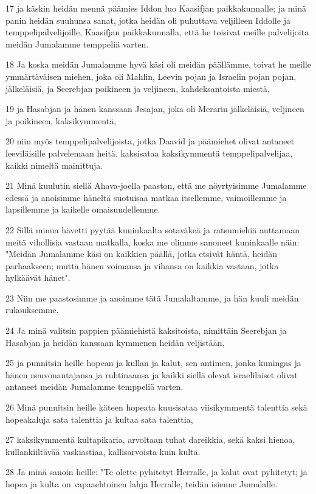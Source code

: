 \par 17 ja käskin heidän mennä päämies Iddon luo Kaasifjan paikkakunnalle; ja minä panin heidän suuhunsa sanat, jotka heidän oli puhuttava veljilleen Iddolle ja temppelipalvelijoille, Kaasifjan paikkakunnalla, että he toisivat meille palvelijoita meidän Jumalamme temppeliä varten.
\par 18 Ja koska meidän Jumalamme hyvä käsi oli meidän päällämme, toivat he meille ymmärtäväisen miehen, joka oli Mahlin, Leevin pojan ja Israelin pojan pojan, jälkeläisiä, ja Seerebjan poikineen ja veljineen, kahdeksantoista miestä,
\par 19 ja Hasabjan ja hänen kanssaan Jesajan, joka oli Merarin jälkeläisiä, veljineen ja poikineen, kaksikymmentä,
\par 20 niin myös temppelipalvelijoista, jotka Daavid ja päämiehet olivat antaneet leeviläisille palvelemaan heitä, kaksisataa kaksikymmentä temppelipalvelijaa, kaikki nimeltä mainittuja.
\par 21 Minä kuulutin siellä Ahava-joella paaston, että me nöyrtyisimme Jumalamme edessä ja anoisimme häneltä suotuisaa matkaa itsellemme, vaimoillemme ja lapsillemme ja kaikelle omaisuudellemme.
\par 22 Sillä minua hävetti pyytää kuninkaalta sotaväkeä ja ratsumiehiä auttamaan meitä vihollisia vastaan matkalla, koska me olimme sanoneet kuninkaalle näin: "Meidän Jumalamme käsi on kaikkien päällä, jotka etsivät häntä, heidän parhaakseen; mutta hänen voimansa ja vihansa on kaikkia vastaan, jotka hylkäävät hänet".
\par 23 Niin me paastosimme ja anoimme tätä Jumalaltamme, ja hän kuuli meidän rukouksemme.
\par 24 Ja minä valitsin pappien päämiehistä kaksitoista, nimittäin Seerebjan ja Hasabjan ja heidän kanssaan kymmenen heidän veljistään,
\par 25 ja punnitsin heille hopean ja kullan ja kalut, sen antimen, jonka kuningas ja hänen neuvonantajansa ja ruhtinaansa ja kaikki siellä olevat israelilaiset olivat antaneet meidän Jumalamme temppeliä varten.
\par 26 Minä punnitsin heille käteen hopeata kuusisataa viisikymmentä talenttia sekä hopeakaluja sata talenttia ja kultaa sata talenttia,
\par 27 kaksikymmentä kultapikaria, arvoltaan tuhat dareikkia, sekä kaksi hienoa, kullankiiltävää vaskiastiaa, kallisarvoista kuin kulta.
\par 28 Ja minä sanoin heille: "Te olette pyhitetyt Herralle, ja kalut ovat pyhitetyt; ja hopea ja kulta on vapaaehtoinen lahja Herralle, teidän isienne Jumalalle.
